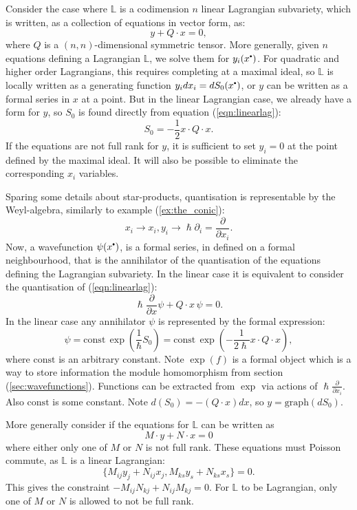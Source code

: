     Consider the case where \(\mathbb{L}\) is a codimension \(n\) linear Lagrangian subvariety, which is written, as a collection of equations in vector form, as:
    \begin{equation}
        \label{eqn:linearlag}
        y + Q \cdot x = 0,
    \end{equation}
    where \(Q\) is a \((n,n)\)-dimensional symmetric tensor. More generally, given \(n\) equations defining a Lagrangian \( \mathbb{L}\), we solve them for \(y_i(x^{\sbt})\). For quadratic and higher order Lagrangians, this requires completing at a maximal ideal, so \( \mathbb{L}\) is locally written as a generating function \(y_i dx_i =  dS_0(x^{\sbt})\), or \(y\) can be written as a formal series in \(x\) at a point. But in the linear Lagrangian case, we already have a form for \(y\), so \(S_0\) is found directly from equation (\ref{eqn:linearlag}): 
    \[S_0 = -\frac{1}{2} x \cdot Q \cdot x. \]
    If the equations are not full rank for \(y\), it is sufficient to set \(y_i=0\) at the point defined by the maximal ideal. It will also be possible to eliminate the corresponding \(x_i\) variables.
    
    Sparing some details about star-products, quantisation is representable by the Weyl-algebra, similarly to example (\ref{ex:the_conic}): 
    \[ x_i \rightarrow x_i, y_i \rightarrow \hslash \partial_i = \frac{\partial}{\partial x_i}.\]
    Now, a wavefunction \( \psi(x^{\sbt})\), is a formal series, in defined on a formal neighbourhood, that is the annihilator of the quantisation of the equations defining the Lagrangian subvariety. In the linear case it is equivalent to consider the quantisation of (\ref{eqn:linearlag}):
    \[ \hslash \frac{\partial}{\partial x} \psi + Q \cdot x\, \psi = 0. \]
    In the linear case any annihilator \( \psi\) is represented by the formal expression:
    \[ \psi = \mathrm{const} \, \exp \left( \frac{1}{\hslash} S_0 \right) = \mathrm{const} \, \exp \left( -\frac{1}{2\hslash} x \cdot Q \cdot x \right), \]
    where \( \mathrm{const}\) is an arbitrary constant.
    Note \(\exp(f) \) is a formal object which is a way to store information the module homomorphism from section (\ref{sec:wavefunctions}). Functions can be extracted from \(\exp\) via actions of \(\hslash \frac{\partial}{\partial x_i }\). Also \( \mathrm{const}\) is some constant. Note \(  d (S_0 ) = -(Q \cdot x) dx\), so \( y=\mathrm{graph}(dS_0)\). 
    
    More generally consider if the equations for \( \mathbb{L}\) can be written as
    \[ M \cdot y + N \cdot x = 0\]
    where either only one of \(M\) or \(N\) is not full rank. These equations must Poisson commute, as \(\mathbb{L}\) is a linear Lagrangian:
    \[ \{ M_{ij} y_j + N_{ij}x_j , M_{ks}y_s + N_{ks}x_s \} = 0.\]
    This gives the constraint \(- M_{ij} N_{kj}+N_{ij} M_{kj} = 0\). For \( \mathbb{L}\) to be Lagrangian, only one of \(M\) or \(N\) is allowed to not be full rank. 
    

